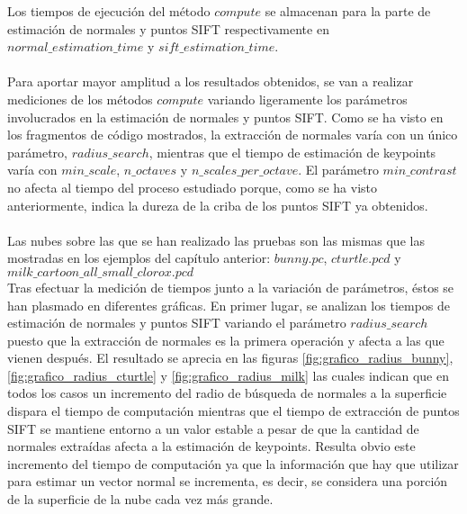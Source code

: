 Los tiempos de ejecución del método $compute$ se almacenan para la parte de estimación de normales y puntos SIFT respectivamente en $normal\_estimation\_time$ y $sift\_estimation\_time$.
\\
\\
Para aportar mayor amplitud a los resultados obtenidos, se van a realizar mediciones de los métodos $compute$ variando ligeramente los parámetros involucrados en la estimación de normales y puntos SIFT. Como se ha visto en los fragmentos de código mostrados, la extracción de normales varía con un único parámetro, $radius\_search$, mientras que el tiempo de estimación de keypoints varía con $min\_scale$, $n\_octaves$ y $n\_scales\_per\_octave$. El parámetro $min\_contrast$ no afecta al tiempo del proceso estudiado porque, como se ha visto anteriormente, indica la dureza de la criba de los puntos SIFT ya obtenidos.
\\
\\
Las nubes sobre las que se han realizado las pruebas son las mismas que las mostradas en los ejemplos del capítulo anterior: $bunny.pc$, $cturtle.pcd$ y $milk\_cartoon\_all\_small\_clorox.pcd$
\\
Tras efectuar la medición de tiempos junto a la variación de parámetros, éstos se han plasmado en diferentes gráficas. En primer lugar, se analizan los tiempos de estimación de normales y puntos SIFT variando el parámetro $radius\_search$ puesto que la extracción de normales es la primera operación y afecta a las que vienen después. El resultado se aprecia en las figuras \ref{fig:grafico_radius_bunny}, \ref{fig:grafico_radius_cturtle} y \ref{fig:grafico_radius_milk} las cuales indican que en todos los casos un incremento del radio de búsqueda de normales a la superficie dispara el tiempo de computación mientras que el tiempo de extracción de puntos SIFT se mantiene entorno a un valor estable a pesar de que la cantidad de normales extraídas afecta a la estimación de keypoints. Resulta obvio este incremento del tiempo de computación ya que la información que hay que utilizar para estimar un vector normal se incrementa, es decir, se considera una porción de la superficie de la nube cada vez más grande.
\\
\\
